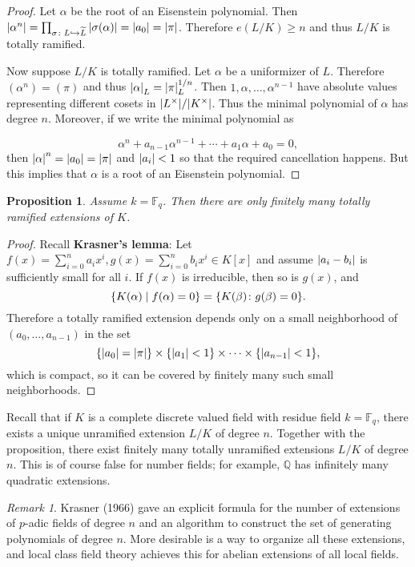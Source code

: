 \documentclass[leqno, openany]{memoir}
\newtheorem{prop}[thm]{Proposition}
\theoremstyle{definition}
\theoremstyle{remark}
\newtheorem{rmk}[thm]{Remark}
\theoremstyle{plain}
\theoremstyle{definition}
\theoremstyle{remark}
\newcommand{\F}{\mathbb{F}}
\newcommand{\Q}{\mathbb{Q}}
\newcommand{\wt}[1]{\widetilde{#1}}
\begin{document}
\begin{proof} Let $\alpha$ be the root of an Eisenstein polynomial. Then
    $\abs{\alpha^n} = \prod_{\sigma \colon L \hookrightarrow \wt{L}}
    \abs{\sigma(\alpha)} = \abs{a_0} = \abs{\pi}$. Therefore $e(L/K) \geq n$
    and thus $L/K$ is totally ramified.

    Now suppose $L/K$ is totally ramified. Let $\alpha$ be a uniformizer of
    $L$. Therefore $(\alpha^n) = (\pi)$ and thus $\abs{\alpha}_L =
    \abs{\pi}_L^{1/n}$. Then $1, \alpha, \ldots, \alpha^{n-1}$ have absolute
    values representing different cosets in $\abs{L^{\times}} /
    \abs{K^{\times}}$. Thus the minimal polynomial of $\alpha$ has degree $n$.
    Moreover, if we write the minimal polynomial as

    \[ \alpha^n + a_{n-1} \alpha^{n-1} + \cdots + a_1 \alpha + a_0 = 0, \] then
    $\abs{\alpha}^n = \abs{a_0} = \abs{\pi}$ and $\abs{a_i} < 1$ so that the
    required cancellation happens. But this implies that $\alpha$ is a root of
    an Eisenstein polynomial.  \end{proof}

\begin{prop} Assume $k = \F_q$. Then there are only finitely many totally
ramified extensions of $K$.  \end{prop}

\begin{proof} Recall \textbf{Krasner's lemma}: Let $f(x) = \sum_{i=0}^n a_i
    x^i, g(x) = \sum_{i=0}^n b_i x^i \in K[x]$ and assume $\abs{a_i - b_i}$ is
    sufficiently small for all $i$. If $f(x)$ is irreducible, then so is
    $g(x)$, and \[ \qty{K(\alpha) \mid f(\alpha) = 0} = \qty{K(\beta) \colon
    g(\beta) = 0}. \] Therefore a totally ramified extension depends only on a
    small neighborhood of $(a_0, \ldots, a_{n-1})$ in the set \[ \qty{\abs{a_0}
    = \abs{\pi}} \times \qty{\abs{a_1} < 1} \times \cdots \times
\qty{\abs{a_{n-1}} < 1}, \] which is compact, so it can be covered by finitely
many such small neighborhoods.  \end{proof}

Recall that if $K$ is a complete discrete valued field with residue field $k =
\F_q$, there exists a unique unramified extension $L/K$ of degree $n$. Together
with the proposition, there exist finitely many totally unramified extensions
$L/K$ of degree $n$. This is of course false for number fields; for example,
$\Q$ has infinitely many quadratic extensions.

\begin{rmk} Krasner (1966) gave an explicit formula for the number of
    extensions of $p$-adic fields of degree $n$ and an algorithm to construct
    the set of generating polynomials of degree $n$. More desirable is a way to
    organize all these extensions, and local class field theory achieves this
    for abelian extensions of all local fields.  \end{rmk}
\end{document}
